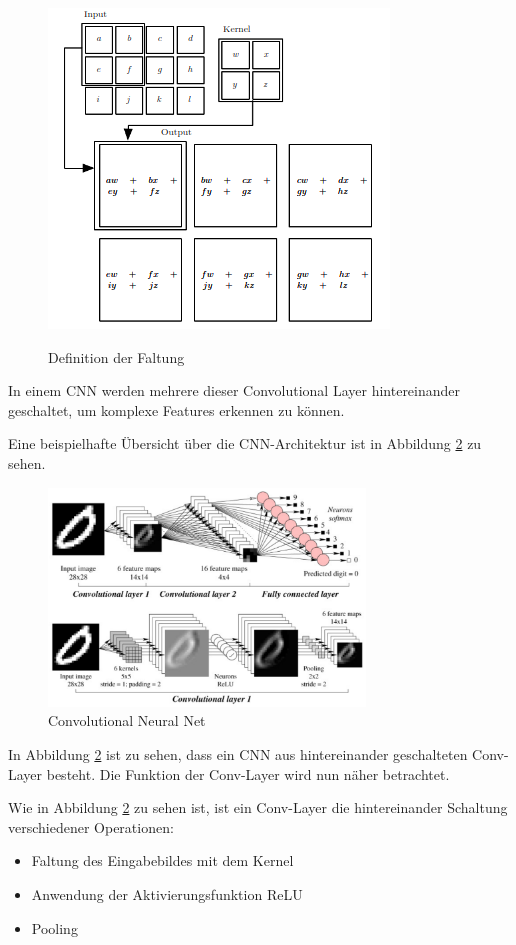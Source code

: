 \begin{figure}[h]
 \centering
 \includegraphics[width=0.45 \textwidth,keepaspectratio=true]{images/convolution.png}
 \label{fig:faltung}
 \caption{Definition der Faltung \cite{CNNBook}}
\end{figure}

In einem CNN werden mehrere dieser Convolutional Layer hintereinander geschaltet, um komplexe Features erkennen zu können. 



Eine beispielhafte Übersicht über die CNN-Architektur ist in Abbildung \ref{fig:cnn} zu sehen.


\begin{figure}[h]
  \centering
  \includegraphics[width=0.75\textwidth]{images/cnn.pdf}
  \caption{Convolutional Neural Net \cite{CNNImg}}
  \label{fig:cnn}
\end{figure}

In Abbildung \ref{fig:cnn} ist zu sehen, dass ein CNN aus hintereinander geschalteten Conv-Layer besteht. Die Funktion der Conv-Layer wird nun näher betrachtet.

Wie in Abbildung \ref{fig:cnn} zu sehen ist, ist ein Conv-Layer die hintereinander Schaltung verschiedener Operationen:
\begin{itemize}
 \item Faltung des Eingabebildes mit dem Kernel
 \item Anwendung der Aktivierungsfunktion ReLU
 \item Pooling
\end{itemize}

